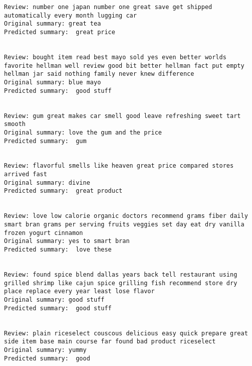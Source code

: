 \documentclass[11pt]{article}
\begin{document}
\begin{Verbatim}[commandchars=\\\{\}]
Review: number one japan number one great save get shipped automatically every month lugging car 
Original summary: great tea 
Predicted summary:  great price


Review: bought item read best mayo sold yes even better worlds favorite hellman well review good bit better hellman fact put empty hellman jar said nothing family never knew difference 
Original summary: blue mayo 
Predicted summary:  good stuff


Review: gum great makes car smell good leave refreshing sweet tart smooth 
Original summary: love the gum and the price 
Predicted summary:  gum


Review: flavorful smells like heaven great price compared stores arrived fast 
Original summary: divine 
Predicted summary:  great product


Review: love low calorie organic doctors recommend grams fiber daily smart bran grams per serving fruits veggies set day eat dry vanilla frozen yogurt cinnamon 
Original summary: yes to smart bran 
Predicted summary:  love these


Review: found spice blend dallas years back tell restaurant using grilled shrimp like cajun spice grilling fish recommend store dry place replace every year least lose flavor 
Original summary: good stuff 
Predicted summary:  good stuff


Review: plain riceselect couscous delicious easy quick prepare great side item base main course far found bad product riceselect 
Original summary: yummy 
Predicted summary:  good



    \end{Verbatim}


    
    
    
    
\end{document}
